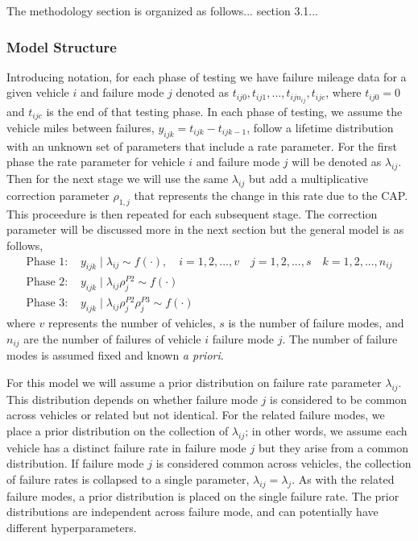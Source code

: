 \documentclass[12pt]{article}
\begin{document}
The methodology section is organized as follows... section 3.1...

\subsubsection{Model Structure}
Introducing notation, for each phase of testing we have failure mileage data for
a given vehicle $i$ and failure mode $j$ denoted as $t_{ij0}, t_{ij1},...,
t_{ijn_{ij}}, t_{ijc}$, where $t_{ij0} = 0$ and $t_{ijc}$ is the end of that
testing phase. In each phase of testing, we assume the vehicle miles between
failures, $y_{ijk} = t_{ijk} - t_{ijk-1}$, follow a lifetime distribution with
an unknown set of parameters that include a rate parameter.  For the first phase
the rate parameter for vehicle $i$ and failure mode $j$ will be denoted as
$\lambda_{ij}$.  Then for the next stage we will use the same $\lambda_{ij}$ but
add a multiplicative correction parameter $\rho_{1,j}$ that represents the
change in this rate due to the CAP.  This proceedure is then repeated for each
subsequent stage.  The correction parameter will be discussed more in the next
section but the general model is as follows,
\begin{align*}
\text{Phase 1: }&y_{ijk}\mid\lambda_{ij}\sim f(\cdot), \quad i = 1,2,...,v \quad
j=1,2,...,s \quad k=1,2,...,n_{ij}\\
\text{Phase 2: }&y_{ijk}\mid\lambda_{ij}\rho_{j}^{P2}\sim f(\cdot) \\
\text{Phase 3: }&y_{ijk}\mid\lambda_{ij}\rho_{j}^{P2}\rho_{j}^{P3}\sim f(\cdot)
\end{align*}
where $v$ represents the number of vehicles, $s$ is the number of failure modes,
and $n_{ij}$ are the number of failures of vehicle $i$ failure mode $j$. The
number of failure modes is assumed fixed and known \textit{a priori}.

For this model we will assume a prior distribution on failure rate parameter
$\lambda_{ij}$.  This distribution depends on whether failure mode $j$ is
considered to be common across vehicles or related but not identical. For the
related failure modes, we place a prior distribution on the collection of
$\lambda_{ij}$; in other words, we assume each vehicle has a distinct failure
rate in failure mode $j$ but they arise from a common distribution.  If failure
mode $j$ is considered common across vehicles, the collection of failure rates
is collapsed to a single parameter, $\lambda_{ij} = \lambda_j$. As with the
related failure modes, a prior distribution is placed on the single failure
rate. The prior distributions are independent across failure mode, and can
potentially have different hyperparameters.
\end{document}
